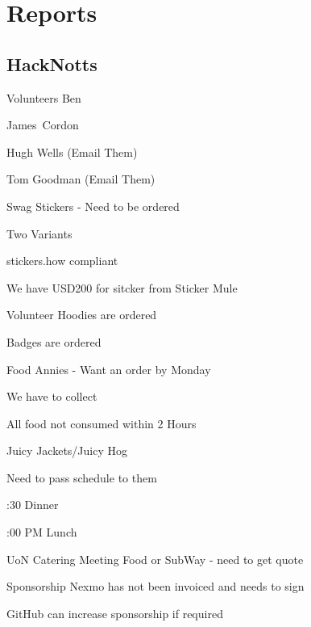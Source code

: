 \documentclass[11pt,hacksoc]{meetingmins}
\begin{document}
\maketitle

\section{Reports}

\subsection{HackNotts}
\begin{hiddensubitems}
	\item
	Volunteers
		\subitem
		Ben
		
		\subitem
		James~Cordon
		
		\subitem
		Hugh Wells (Email Them)
		
		\subitem
		Tom Goodman (Email Them)
		
	\item
	Swag
		\subitem
		Stickers - Need to be ordered
		
			\subsubitem
			Two Variants
			
			\subsubitem
			stickers.how compliant
			
			\subsubitem
			We have USD200 for sitcker from Sticker Mule
			
		\subitem
		Volunteer Hoodies are ordered
		
		\subitem
		Badges are ordered
		
	\item
	Food
		\subitem
		Annies - Want an order by Monday
			
			\subsubitem
			We have to collect
			
			\subsubitem
			All food not consumed within 2 Hours
			
		\subitem
		Juicy Jackets/Juicy Hog
			
			\subsubitem
			Need to pass schedule to them
			
			:30 Dinner
			
			:00 PM Lunch
			
		\subitem
		UoN Catering Meeting Food or SubWay - need to get quote
	
	\item
	Sponsorship
		\subitem
		Nexmo has not been invoiced and needs to sign
		
		\subitem
		GitHub can increase sponsorship if required
		

\end{hiddensubitems}
\end{document}
